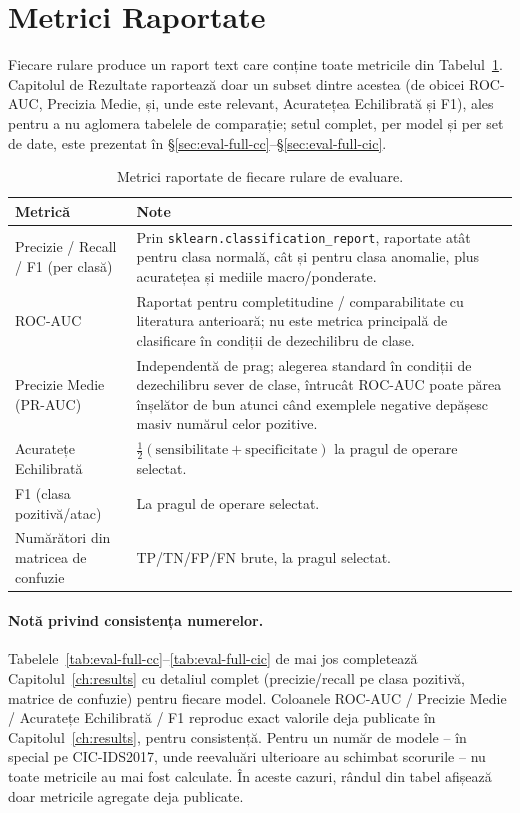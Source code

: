 \section{Metrici Raportate}

Fiecare rulare produce un raport text care conține toate metricile din Tabelul~\ref{tab:eval-metrics-def}. Capitolul de Rezultate raportează doar un subset dintre acestea (de obicei ROC-AUC, Precizia Medie, și, unde este relevant, Acuratețea Echilibrată și F1), ales pentru a nu aglomera tabelele de comparație; setul complet, per model și per set de date, este prezentat în \S\ref{sec:eval-full-cc}--\S\ref{sec:eval-full-cic}.

\begin{table}[H]
\centering
\begin{tabular}{@{}p{4cm}p{9.5cm}@{}}
\toprule
Metrică & Note \\
\midrule
Precizie / Recall / F1 (per clasă) & Prin \texttt{sklearn.classification\_report}, raportate atât pentru clasa normală, cât și pentru clasa anomalie, plus acuratețea și mediile macro/ponderate. \\
ROC-AUC & Raportat pentru completitudine / comparabilitate cu literatura anterioară; nu este metrica principală de clasificare în condiții de dezechilibru de clase. \\
Precizie Medie (PR-AUC) & Independentă de prag; alegerea standard în condiții de dezechilibru sever de clase, întrucât ROC-AUC poate părea înșelător de bun atunci când exemplele negative depășesc masiv numărul celor pozitive. \\
Acuratețe Echilibrată & $\frac{1}{2}(\text{sensibilitate} + \text{specificitate})$ la pragul de operare selectat. \\
F1 (clasa pozitivă/atac) & La pragul de operare selectat. \\
Numărători din matricea de confuzie & TP/TN/FP/FN brute, la pragul selectat. \\
\bottomrule
\end{tabular}
\caption{Metrici raportate de fiecare rulare de evaluare.}
\label{tab:eval-metrics-def}
\end{table}

\paragraph{Notă privind consistența numerelor.} Tabelele~\ref{tab:eval-full-cc}--\ref{tab:eval-full-cic} de mai jos completează Capitolul~\ref{ch:results} cu detaliul complet (precizie/recall pe clasa pozitivă, matrice de confuzie) pentru fiecare model. 
Coloanele ROC-AUC / Precizie Medie / Acuratețe Echilibrată / F1 reproduc exact valorile deja publicate în Capitolul~\ref{ch:results}, pentru consistență. Pentru un număr de modele -- în special pe CIC-IDS2017, unde reevaluări ulterioare au schimbat scorurile -- nu toate metricile au mai fost calculate. În aceste cazuri, rândul din tabel afișează doar metricile agregate deja publicate.

